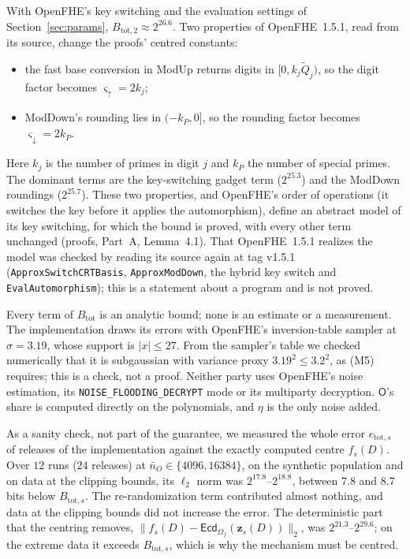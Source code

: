 \documentclass[11pt]{article}
\theoremstyle{definition}
\theoremstyle{plain}
\newcommand{\Ecd}{\mathsf{Ecd}}
\newcommand{\Party}[1]{\textsf{#1}}
\newcommand{\Op}{\Party{O}}
\begin{document}
With OpenFHE's key switching and the evaluation settings of Section~\ref{sec:params}, $B_{\mathrm{tot},2} \approx 2^{26.6}$. Two properties of OpenFHE~1.5.1, read from its source, change the proofs' centred constants:
\begin{itemize}[noitemsep]
  \item the fast base conversion in ModUp returns digits in $[0, k_j\tilde Q_j)$, so the digit factor becomes $\varsigma_\uparrow = 2k_j$;
  \item ModDown's rounding lies in $(-k_P, 0]$, so the rounding factor becomes $\varsigma_\downarrow = 2k_P$.
\end{itemize}
Here $k_j$ is the number of primes in digit $j$ and $k_P$ the number of special primes. The dominant terms are the key-switching gadget term ($2^{25.3}$) and the ModDown roundings ($2^{25.7}$). These two properties, and OpenFHE's order of operations (it switches the key before it applies the automorphism), define an abstract model of its key switching, for which the bound is proved, with every other term unchanged (proofs, Part~A, Lemma~4.1). That OpenFHE~1.5.1 realizes the model was checked by reading its source again at tag v1.5.1 (\texttt{ApproxSwitchCRTBasis}, \texttt{ApproxModDown}, the hybrid key switch and \texttt{EvalAutomorphism}); this is a statement about a program and is not proved.

Every term of $B_{\mathrm{tot}}$ is an analytic bound; none is an estimate or a measurement. The implementation draws its errors with OpenFHE's inversion-table sampler at $\sigma = 3.19$, whose support is $|x| \le 27$. From the sampler's table we checked numerically that it is subgaussian with variance proxy $3.19^2 \le 3.2^2$, as (M5) requires; this is a check, not a proof. Neither party uses OpenFHE's noise estimation, its \texttt{NOISE\_FLOODING\_DECRYPT} mode or its multiparty decryption. $\Op$'s share is computed directly on the polynomials, and $\eta$ is the only noise added.

As a sanity check, not part of the guarantee, we measured the whole error $e_{\mathrm{tot},s}$ of releases of the implementation against the exactly computed centre $f_s(D)$. Over $12$ runs ($24$ releases) at $\bar n_O \in \{4096, 16384\}$, on the synthetic population and on data at the clipping bounds, its $\ell_2$ norm was $2^{17.8}$--$2^{18.8}$, between $7.8$ and $8.7$ bits below $B_{\mathrm{tot},s}$. The re-randomization term contributed almost nothing, and data at the clipping bounds did not increase the error. The deterministic part that the centring removes, $\|f_s(D) - \Ecd_{\Omega_f}(\mathbf z_s(D))\|_2$, was $2^{21.3}$--$2^{29.6}$; on the extreme data it exceeds $B_{\mathrm{tot},s}$, which is why the mechanism must be centred.
\end{document}

